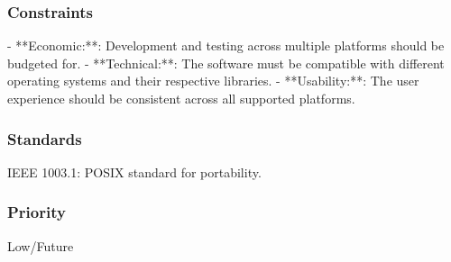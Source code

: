\subsubsection{Constraints}
- **Economic:**: Development and testing across multiple platforms should be budgeted for.
- **Technical:**: The software must be compatible with different operating systems and their respective libraries.
- **Usability:**: The user experience should be consistent across all supported platforms.
\subsubsection{Standards}
IEEE 1003.1: POSIX standard for portability.
\subsubsection{Priority}
Low/Future
